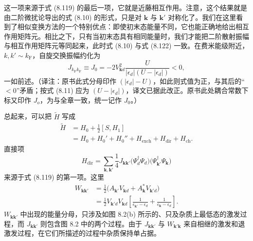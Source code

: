 这一项来源于式 (8.119) 的最后一项，它就是近藤相互作用。注意，这个结果就是由二阶微扰论导出的式 (8.10) 的形式，只是对 $\mathbf{k}$ 与 $\mathbf{k}'$ 对称化了。我们在这里看到了相似变换方法的一个特别优点：即使初末态能量不同，它也能正确地给出相互作用矩阵元。相比之下，只有当初末态具有相同能量时，我们才能把二阶散射振幅与相互作用矩阵元等同起来，此时式 (8.10) 与式 (8.122) 一致。在费米能级附近，$k, k' \sim k_{\mathrm{F}}$，自旋交换振幅约化为
\begin{equation*}
J_{k_{\mathrm{F}} k_{\mathrm{F}}} \equiv J_{0} = -2 V_{\mathbf{k}d}^{2} \frac{U}{|\epsilon_{d}| (U - |\epsilon_{d}|)} < 0,
\tag{8.123}
\end{equation*}
一如前述。（译注：原书此式分母印作 $(|\epsilon_{d}| - U)$，如此则式值为正，与其后的“$<0$”矛盾；按式 (8.11) 应为 $(U - |\epsilon_{d}|)$，译文已据此改正。原书此处耦合常数下标又印作 $J_{o}$，为与全章一致，统一记作 $J_{0}$。）

总起来，可以把 $\widetilde{H}$ 写成
\begin{equation*}
\begin{aligned}
\widetilde{H} &= H_{0} + \frac{1}{2}[S, H_{1}] \\
&= H_{0} + H_{0}' + H_{0}'' + H_{\mathrm{exch}} + H_{\mathrm{dir}} + H_{\mathrm{ch}}.
\end{aligned}
\tag{8.124}
\end{equation*}
直接项
\begin{equation*}
H_{\mathrm{dir}} = \sum_{\mathbf{k},\mathbf{k}'} \frac{1}{4} J_{\mathbf{k}\mathbf{k}'} \big( \Psi_{d}^{\dagger} \Psi_{d} \big) \big( \Psi_{\mathbf{k}'}^{\dagger} \Psi_{\mathbf{k}} \big)
\tag{8.125}
\end{equation*}
来源于式 (8.119) 的第一项。这里
\begin{equation*}
\begin{aligned}
W_{\mathbf{k}\mathbf{k}'} &= \frac{1}{2} \big( A_{\mathbf{k}'} V_{\mathbf{k}d} + A_{\mathbf{k}}^{*} V_{\mathbf{k}'d} \big) \\
&= \frac{1}{2} V_{\mathbf{k}'d} V_{\mathbf{k}d} \left[ \frac{1}{\epsilon_{\mathbf{k}'} - \epsilon_{d}} + \frac{1}{\epsilon_{\mathbf{k}} - \epsilon_{d}} \right].
\end{aligned}
\tag{8.126}
\end{equation*}
$W_{\mathbf{k}\mathbf{k}'}$ 中出现的能量分母，只涉及如图 8.2(b) 所示的、只及杂质上最低态的激发过程，而 $J_{\mathbf{k}\mathbf{k}'}$ 则包含图 8.2 中的两个过程。由于 $J_{\mathbf{k}\mathbf{k}'}$ 与 $W_{\mathbf{k}'\mathbf{k}}$ 来自相继的激发和退激发过程，在它们所描述的过程中杂质保持单占据。

